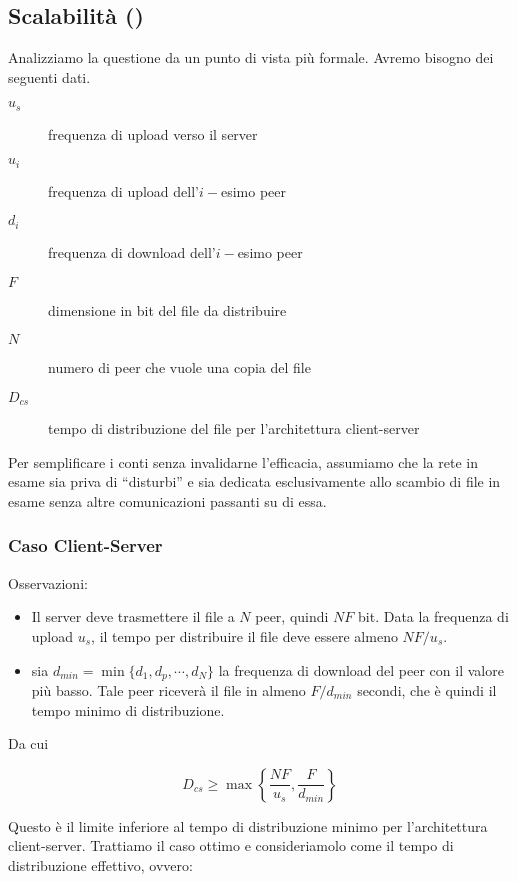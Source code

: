 \subsection{Scalabilità (\cite{kurose-ross})}\label{scalabilità}

Analizziamo la questione da un punto di vista più formale. Avremo
bisogno dei seguenti dati.

\begin{description}
\item[$u_s$]
frequenza di upload verso il server
\item[$u_i$]
frequenza di upload dell'$i-$esimo peer
\item[$d_i$]
frequenza di download dell'$i-$esimo peer
\item[$F$]
dimensione in bit del file da distribuire
\item[$N$]
numero di peer che vuole una copia del file
\item[$D_{cs}$]
tempo di distribuzione del file per l'architettura client-server
\end{description}

Per semplificare i conti senza invalidarne l'efficacia, assumiamo che la
rete in esame sia priva di ``disturbi'' e sia dedicata esclusivamente
allo scambio di file in esame senza altre comunicazioni passanti su di
essa.

\subsubsection{Caso Client-Server}\label{caso-client-server}

Osservazioni:

\begin{itemize}
\item
  Il server deve trasmettere il file a $N$ peer, quindi $NF$ bit. Data
  la frequenza di upload $u_s$, il tempo per distribuire il file deve
  essere almeno $NF/u_s$.
\item
  sia $d_{min} = \min\{d_1,d_p,\cdots,d_N \}$ la frequenza di download
  del peer con il valore più basso. Tale peer riceverà il file in almeno
  $F/d_{min}$ secondi, che è quindi il tempo minimo di distribuzione.
\end{itemize}

Da cui

\[D_{cs} \geq \max \left\lbrace \frac{NF}{u_s}, \frac{F}{d_{min}} \right\rbrace\]

Questo è il limite inferiore al tempo di distribuzione minimo per
l'architettura client-server. Trattiamo il caso ottimo e consideriamolo
come il tempo di distribuzione effettivo, ovvero:


